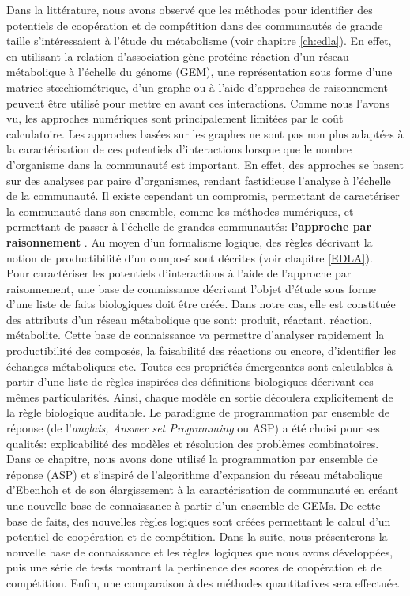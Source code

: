\documentclass[../main.tex]{subfiles}
\begin{document}
Dans la littérature, nous avons observé que les méthodes pour identifier des potentiels de coopération et de compétition dans des communautés de grande taille s'intéressaient à l'étude du métabolisme (voir chapitre \ref{ch:edla}). En effet, en utilisant la relation d'association gène-protéine-réaction d'un réseau métabolique à l'échelle du génome (GEM), une représentation sous forme d'une matrice st\oe{}chiométrique, d'un graphe ou à l'aide d'approches de raisonnement peuvent être utilisé pour mettre en avant ces interactions. Comme nous l'avons vu, les approches numériques sont principalement limitées par le coût calculatoire. Les approches basées sur les graphes ne sont pas non plus adaptées à la caractérisation de ces potentiels d'interactions lorsque que le nombre d'organisme dans la communauté est important. En effet, des approches se basent sur des analyses par paire d'organismes, rendant fastidieuse l'analyse à l'échelle de la communauté. Il existe cependant un compromis, permettant de caractériser la communauté dans son ensemble, comme les méthodes numériques, et permettant de passer à l'échelle de grandes communautés: \textbf{l'approche par raisonnement} \citep{Belcour.2020, Frioux2018}. Au moyen d'un formalisme logique, des règles décrivant la notion de productibilité d'un composé sont décrites (voir chapitre \ref{EDLA}). \\

Pour caractériser les potentiels d'interactions à l'aide de l'approche par raisonnement, une base de connaissance décrivant l'objet d'étude sous forme d'une liste de faits biologiques doit être créée. Dans notre cas, elle est constituée des attributs d'un réseau métabolique que sont: produit, réactant, réaction, métabolite. Cette base de connaissance va permettre d'analyser rapidement la productibilité des composés, la faisabilité des réactions ou encore, d'identifier les échanges métaboliques etc. Toutes ces propriétés émergeantes sont calculables à partir d'une liste de règles inspirées des définitions biologiques décrivant ces mêmes particularités. Ainsi, chaque modèle en sortie découlera explicitement de la règle biologique auditable. Le paradigme de programmation par ensemble de réponse (de l’\textit{anglais, Answer set Programming} ou ASP) a été choisi pour ses qualités: explicabilité des modèles et résolution des problèmes combinatoires.\\

Dans ce chapitre, nous avons donc utilisé la programmation par ensemble de réponse (ASP) et s'inspiré de l'algorithme d'expansion du réseau métabolique d'Ebenhoh \citep{Ebenhoh2004} et de son élargissement à la caractérisation de communauté \citep{Frioux2018} en créant une nouvelle base de connaissance à partir d'un ensemble de GEMs. De cette base de faits, des nouvelles règles logiques sont créées permettant le calcul d'un potentiel de coopération et de compétition. Dans la suite, nous présenterons la nouvelle base de connaissance et les règles logiques que nous avons développées, puis une série de tests montrant la pertinence des scores de coopération et de compétition. Enfin, une comparaison à des méthodes quantitatives sera effectuée. \\
\end{document}
